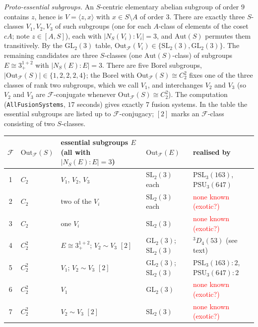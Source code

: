 \documentclass[11pt]{article}
\theoremstyle{definition}
\theoremstyle{remark}
\newcommand{\F}{\mathcal{F}}
\newcommand{\Aut}{\mathrm{Aut}}
\newcommand{\Out}{\mathrm{Out}}
\newcommand{\GL}{\mathrm{GL}}
\newcommand{\SL}{\mathrm{SL}}
\newcommand{\PSL}{\mathrm{PSL}}
\newcommand{\PSU}{\mathrm{PSU}}
\begin{document}
\emph{Proto-essential subgroups.}  An $S$-centric elementary abelian
subgroup of order $9$ contains $z$, hence is $V=\langle z,x\rangle$ with
$x\in S\setminus A$ of order $3$.  There are exactly three $S$-classes
$V_1,V_2,V_3$ of such subgroups (one for each $A$-class of elements of the
coset $cA$; note $z\in[A,S]$), each with $|N_S(V_i):V_i|=3$, and
$\Aut(S)$ permutes them transitively.  By the $\GL_2(3)$ table,
$\Out_\F(V_i)\in\{\SL_2(3),\GL_2(3)\}$.  The remaining candidates are three
$S$-classes (one $\Aut(S)$-class) of subgroups $E\cong3^{1+2}_+$ with
$|N_S(E):E|=3$.  There are five Borel subgroups, $|\Out_\F(S)|\in\{1,2,2,2,4\}$;
the Borel with $\Out_\F(S)\cong C_2^2$ fixes one of the three classes of
rank two subgroups, which we call $V_1$, and interchanges $V_2$ and $V_3$
(so $V_2$ and $V_3$ are $\F$-conjugate whenever $\Out_\F(S)\cong C_2^2$).
The computation (\texttt{AllFusionSystems}, $17$ seconds) gives exactly
$7$ fusion systems.  In the table the essential subgroups are listed up to
$\F$-conjugacy; $[2]$ marks an $\F$-class consisting of two $S$-classes.

\begin{center}
\begin{tabular}{cllll}
\toprule
$\F$ & $\Out_\F(S)$ & essential subgroups $E$ (all with $|N_S(E):E|=3$) & $\Out_\F(E)$ & realised by\\
\midrule
1 & $C_2$ & $V_1$, $V_2$, $V_3$ & $\SL_2(3)$ each & $\PSL_3(163)$, $\PSU_3(647)$\\
2 & $C_2$ & two of the $V_i$ & $\SL_2(3)$ each & \textcolor{red}{none known (exotic?)}\\
3 & $C_2$ & one $V_i$ & $\SL_2(3)$ & \textcolor{red}{none known (exotic?)}\\
4 & $C_2^2$ & $E\cong3^{1+2}_+$; $V_2\sim V_3$ $[2]$ & $\GL_2(3)$; $\SL_2(3)$ & ${}^3D_4(53)$ (see text)\\
5 & $C_2^2$ & $V_1$; $V_2\sim V_3$ $[2]$ & $\GL_2(3)$; $\SL_2(3)$ & $\PSL_3(163){:}2$, $\PSU_3(647){:}2$\\
6 & $C_2^2$ & $V_1$ & $\GL_2(3)$ & \textcolor{red}{none known (exotic?)}\\
7 & $C_2^2$ & $V_2\sim V_3$ $[2]$ & $\SL_2(3)$ & \textcolor{red}{none known (exotic?)}\\
\bottomrule
\end{tabular}
\end{center}
\end{document}
